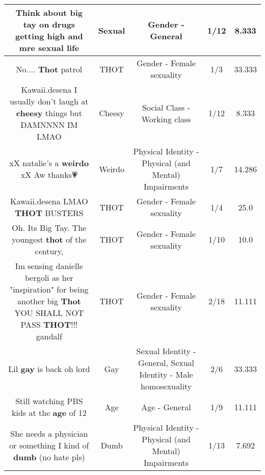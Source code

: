 \documentclass[11pt]{article}
\newlength\mylength
\begin{document}
\begin{center}
\begin{longtable}{|C{.65\mylength}|C{.30\mylength}|C{.12\mylength}|C{.12\mylength}|C{.12\mylength}|}
  \small Think about big tay on drugs getting high and mre \textbf{sexual} life\normalsize   & Sexual & Gender - General & 1/12 & 8.333 \\  \hline
  \small No.... \textbf{Thot} patrol\normalsize   & THOT & Gender - Female sexuality & 1/3 & 33.333 \\  \hline
  \small Kawaii.desena I usually don't laugh at \textbf{cheesy} things but DAMNNNN IM LMAO\normalsize   & Cheesy & Social Class - Working class & 1/12 & 8.333 \\  \hline
  \small xX natalie's a \textbf{weirdo} xX Aw thanks💗\normalsize   & Weirdo & Physical Identity - Physical (and Mental) Impairments & 1/7 & 14.286 \\  \hline
  \small Kawaii.desena LMAO \textbf{THOT} BUSTERS\normalsize   & THOT & Gender - Female sexuality & 1/4 & 25.0 \\  \hline
  \small Oh. Its Big Tay. The youngest \textbf{thot} of the century,\normalsize   & THOT & Gender - Female sexuality & 1/10 & 10.0 \\  \hline
  \small Im sensing danielle bergoli as her "inspiration" for being another big \textbf{Thot} YOU SHALL NOT PASS \textbf{THOT}!!! gandalf\normalsize   & THOT & Gender - Female sexuality & 2/18 & 11.111 \\  \hline
  \small Lil \textbf{g\textbf{ay}} is back oh lord\normalsize   & Gay & Sexual Identity - General, Sexual Identity - Male homosexuality & 2/6 & 33.333 \\  \hline
  \small Still watching PBS kids at the \textbf{age} of 12\normalsize   & Age & Age - General & 1/9 & 11.111 \\  \hline
  \small She needs a physician or something I kind of \textbf{dumb} (no hate pls)\normalsize   & Dumb & Physical Identity - Physical (and Mental) Impairments & 1/13 & 7.692 \\  \hline

\end{longtable}
\end{center}
\end{document}
